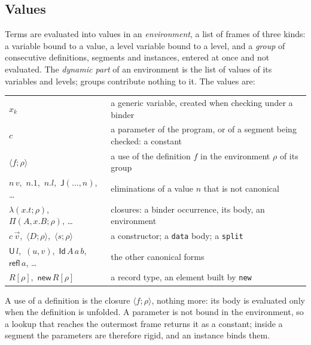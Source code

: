 \documentclass[11pt]{article}
\newcommand{\kw}[1]{\texttt{#1}}
\newcommand{\U}{\mathsf{U}}
\newcommand{\Id}{\mathsf{Id}}
\theoremstyle{remark}
\begin{document}
\subsection{Values}\label{sec:impl-values}

Terms are evaluated into values in an \emph{environment}, a list of
frames of three kinds: a variable bound to a value, a level variable
bound to a level, and a \emph{group} of consecutive definitions,
segments and instances, entered at once and not evaluated. The
\emph{dynamic part} of an environment is the list of values of its
variables and levels; groups contribute nothing to it. The values are:
\begin{center}
\begin{tabular}{@{}l@{\quad}p{8.6cm}@{}}
$x_k$ & a generic variable, created when checking under a binder\\
$c$ & a parameter of the program, or of a segment being checked: a constant\\
$\langle f;\rho\rangle$ & a use of the definition $f$ in the environment $\rho$ of its group\\
$n\,v$,\ $n.1$,\ $n.l$,\ $\mathsf{J}(\dots,n)$, \dots & eliminations of a value $n$ that is not canonical\\
$\lambda(x.t;\rho)$,\ $\Pi(A,x.B;\rho)$, \dots & closures: a binder occurrence, its body, an environment\\
$c\,\vec v$,\ $\langle D;\rho\rangle$,\ $\langle s;\rho\rangle$ & a constructor; a \kw{data} body; a \kw{split}\\
$\U\,l$,\ $(u,v)$,\ $\Id\,A\,a\,b$,\ $\mathsf{refl}\,a$, \dots & the other canonical forms\\
$R[\rho]$,\ $\mathsf{new}\,R[\rho]$ & a record type, an element built by \kw{new}
\end{tabular}
\end{center}
A use of a definition is the closure $\langle f;\rho\rangle$, nothing
more: its body is evaluated only when the definition is unfolded. A
parameter is not bound in the environment, so a lookup that reaches the
outermost frame returns it as a constant; inside a segment the
parameters are therefore rigid, and an instance binds them.
\end{document}
